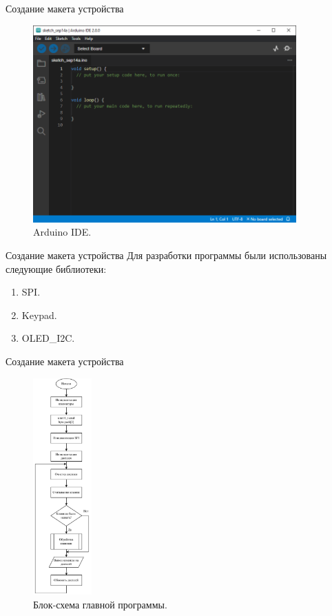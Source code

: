 \documentclass[10pt]{beamer}
\begin{document}
\begin{frame}{Создание макета устройства}
  \begin{figure}
  \includegraphics[width=0.9\textwidth]{ide}
  \caption{Arduino IDE.}
  \end{figure}
\end{frame}

\begin{frame}{Создание макета устройства}
Для разработки программы были использованы следующие библиотеки:
  \begin{enumerate}
  \item SPI.
  \item Keypad.
  \item OLED\_I2C.
  \end{enumerate}
\end{frame}

\begin{frame}{Создание макета устройства}
  \begin{figure}
  \includegraphics[width=0.2\textwidth]{main}
  \caption{Блок-схема главной программы.}
  \end{figure}
\end{frame}
\end{document}
